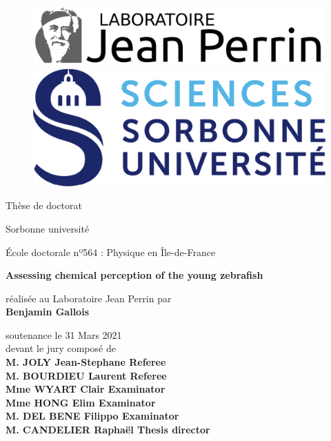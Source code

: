 \thispagestyle{empty}
	
	\begin{figure}[ht]
			\includegraphics[scale=0.5]{cover/ljp.png}
	   \endminipage
			\includegraphics[scale=0.5]{cover/su.png}
		\endminipage
	\end{figure}
	
	\begin{center}
	\vspace{0.3cm}
	\LARGE
	Thèse de doctorat 
	
	\vspace{.1cm}
	\LARGE
	Sorbonne université

	\vspace{.2cm}
	\Large
  École doctorale nº564 : Physique en Île-de-France
	
	\vspace{1cm}	
	\Large
	\textbf{Assessing chemical perception of the young zebrafish}

	\vspace{1cm}
	\normalsize	
	réalisée au Laboratoire Jean Perrin par \\
	\vspace{.2cm}
	\large
	\textbf{Benjamin Gallois}
	
	\vspace{.3cm}
	\normalsize	
	soutenance le 31 Mars 2021 \\
	\vspace{.1cm}
	\normalsize	
	devant le jury composé de \\
	\vspace{.3cm}
	\large
	\textbf{M. JOLY Jean-Stephane \hfill Referee} \\
	\textbf{M. BOURDIEU Laurent \hfill Referee} \\
	\textbf{Mme WYART Clair \hfill Examinator} \\
	\textbf{Mme HONG Elim \hfill Examinator} \\
	\textbf{M. DEL BENE Filippo \hfill Examinator} \\
	\textbf{M. CANDELIER Raphaël \hfill Thesis director} \\
	
	\vspace{1.3cm}
	\end{center}
